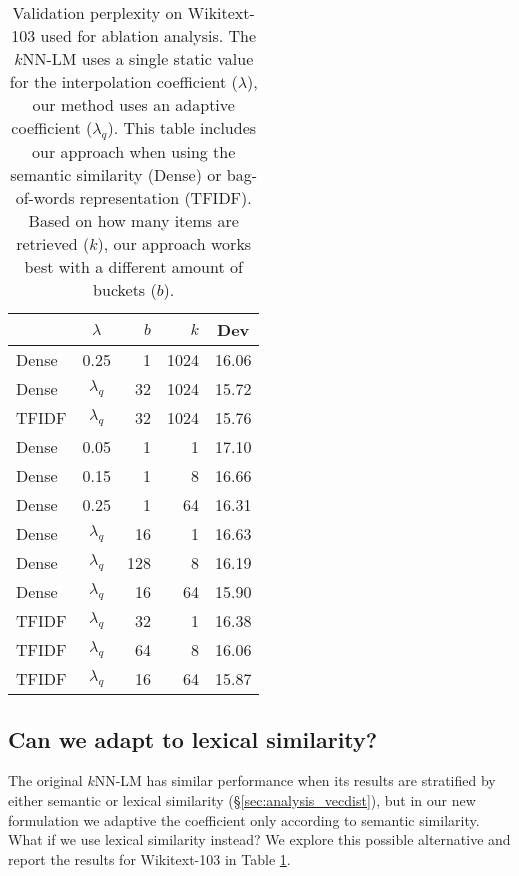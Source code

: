 \documentclass[11pt]{article}
\begin{document}
\begin{table}[t!]
\setlength\tabcolsep{4pt}
\begin{center}
\begin{tabular}{ l | c | r | r | c }
\toprule
 & $\lambda$ & $b$ & $k$ & Dev \\
\midrule
Dense & 0.25        &  1 & 1024 & 16.06 \\
Dense & $\lambda_q$ & 32 & 1024 & 15.72 \\
TFIDF & $\lambda_q$ & 32 & 1024 & 15.76 \\
\midrule
Dense & 0.05  & 1 & 1   & 17.10 \\
Dense & 0.15  & 1 & 8   & 16.66 \\
Dense & 0.25  & 1 & 64  & 16.31 \\
\midrule
Dense & $\lambda_q$ & 16  & 1   & 16.63     \\
Dense & $\lambda_q$ & 128 & 8   & 16.19    \\
Dense & $\lambda_q$ & 16  & 64  & 15.90   \\
\midrule
TFIDF & $\lambda_q$ & 32  & 1   & 16.38     \\
TFIDF & $\lambda_q$ & 64  & 8   & 16.06    \\
TFIDF & $\lambda_q$ & 16  & 64  & 15.87   \\
\bottomrule
\end{tabular}
\end{center}
\caption{Validation perplexity on Wikitext-103 used for ablation analysis. The $k$NN-LM uses a single static value for the interpolation coefficient ($\lambda$), our method uses an adaptive coefficient ($\lambda_q$). This table includes our approach when using the semantic similarity (Dense) or bag-of-words representation (TFIDF). Based on how many items are retrieved ($k$), our approach works best with a different amount of buckets ($b$).}
\label{tab:compare_tfidf}
\end{table}

\subsection{Can we adapt to lexical similarity?}

The original $k$NN-LM has similar performance when its results are stratified by either semantic or lexical similarity (\S\ref{sec:analysis_vecdist}), but in our new formulation we adaptive the coefficient only according to semantic similarity. What if we use lexical similarity instead? We explore this possible alternative and report the results for Wikitext-103 in Table \ref{tab:compare_tfidf}.
\end{document}
